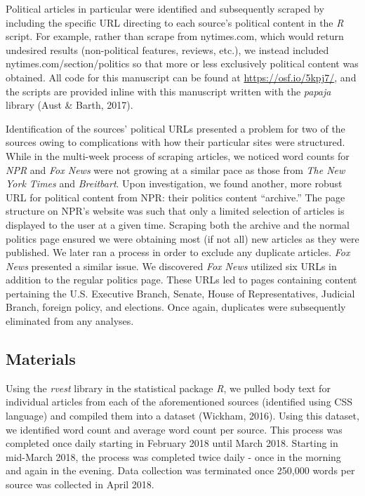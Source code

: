 \documentclass[english,,man]{apa6}
\begin{document}
Political articles in particular were identified and subsequently scraped by including the specific URL directing to each source's political content in the \emph{R} script. For example, rather than scrape from nytimes.com, which would return undesired results (non-political features, reviews, etc.), we instead included nytimes.com/section/politics so that more or less exclusively political content was obtained. All code for this manuscript can be found at \url{https://osf.io/5kpj7/}, and the scripts are provided inline with this manuscript written with the \emph{papaja} library (Aust \& Barth, 2017).

Identification of the sources' political URLs presented a problem for two of the sources owing to complications with how their particular sites were structured. While in the multi-week process of scraping articles, we noticed word counts for \emph{NPR} and \emph{Fox News} were not growing at a similar pace as those from \emph{The New York Times} and \emph{Breitbart}. Upon investigation, we found another, more robust URL for political content from NPR: their politics content \enquote{archive.} The page structure on NPR's website was such that only a limited selection of articles is displayed to the user at a given time. Scraping both the archive and the normal politics page ensured we were obtaining most (if not all) new articles as they were published. We later ran a process in order to exclude any duplicate articles. \emph{Fox News} presented a similar issue. We discovered \emph{Fox News} utilized six URLs in addition to the regular politics page. These URLs led to pages containing content pertaining the U.S. Executive Branch, Senate, House of Representatives, Judicial Branch, foreign policy, and elections. Once again, duplicates were subsequently eliminated from any analyses.

\hypertarget{materials}{%
\subsection{Materials}\label{materials}}

Using the \emph{rvest} library in the statistical package \emph{R}, we pulled body text for individual articles from each of the aforementioned sources (identified using CSS language) and compiled them into a dataset (Wickham, 2016). Using this dataset, we identified word count and average word count per source. This process was completed once daily starting in February 2018 until March 2018. Starting in mid-March 2018, the process was completed twice daily - once in the morning and again in the evening. Data collection was terminated once 250,000 words per source was collected in April 2018.
\end{document}

